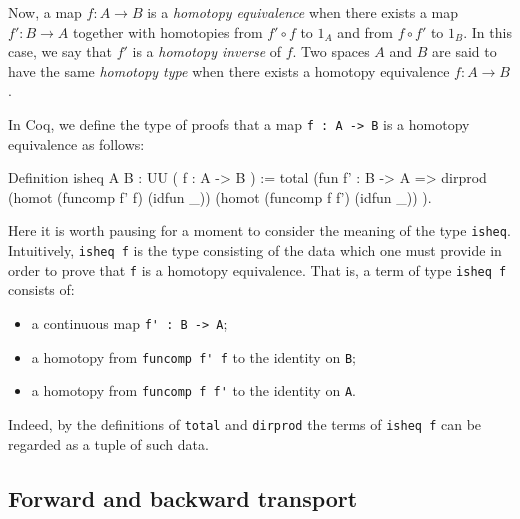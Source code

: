 Now, a map $f:A\to B$ is a \emph{homotopy equivalence} when there exists a
map $f':B\to A$ together with homotopies from $f'\circ f$ to $1_{A}$
and from $f\circ f'$ to $1_{B}$.  In this case, we say that $f'$ is a
\emph{homotopy inverse} of $f$.  Two spaces $A$ and $B$ are said to
have the same \emph{homotopy type} when there exists a homotopy
equivalence $f:A\to B$.

In Coq, we define the type of proofs that a map \verb|f : A -> B|
is a homotopy equivalence as follows:
\begin{center}
  \begin{coqcode}
Definition isheq { A B : UU } ( f : A -> B ) := total (fun f' : B -> A => dirprod (homot (funcomp f' f) (idfun _)) (homot (funcomp f f') (idfun _)) ).
  \end{coqcode}
\end{center}
Here it is worth pausing for a moment to consider the meaning of the
type \verb|isheq|.  Intuitively, \verb|isheq f| is the type
consisting of the data which one must provide in order to prove that
\verb|f| is a homotopy equivalence.  That is, a term of type
\verb|isheq f| consists of:
\begin{itemize}
\item a continuous map \verb|f' : B -> A|;
\item a homotopy from \verb|funcomp f' f| to the identity on \verb|B|;
\item a homotopy from \verb|funcomp f f'| to the identity on
  \verb|A|.
\end{itemize}
Indeed, by the definitions of \verb|total| and
\verb|dirprod| the terms of \verb|isheq f| can be regarded
as a tuple of such data.

\subsection{Forward and backward transport}

